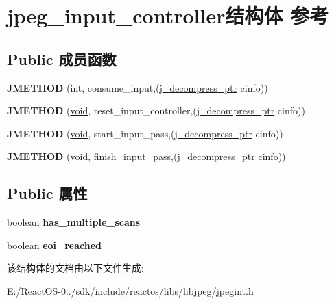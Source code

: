 \hypertarget{structjpeg__input__controller}{}\section{jpeg\+\_\+input\+\_\+controller结构体 参考}
\label{structjpeg__input__controller}
\subsection*{Public 成员函数}
\begin{DoxyCompactItemize}
\item 
\mbox{\label{structjpeg__input__controller_af742c796479db5dd8b3275307d76a103}} 
{\bfseries J\+M\+E\+T\+H\+OD} (int, consume\+\_\+input,(\hyperlink{structjpeg__decompress__struct}{j\+\_\+decompress\+\_\+ptr} cinfo))
\item 
\mbox{\label{structjpeg__input__controller_aa2720adb6f991abedb2e8c03804cac4f}} 
{\bfseries J\+M\+E\+T\+H\+OD} (\hyperlink{interfacevoid}{void}, reset\+\_\+input\+\_\+controller,(\hyperlink{structjpeg__decompress__struct}{j\+\_\+decompress\+\_\+ptr} cinfo))
\item 
\mbox{\label{structjpeg__input__controller_aef985c09924396a078c67592da47d679}} 
{\bfseries J\+M\+E\+T\+H\+OD} (\hyperlink{interfacevoid}{void}, start\+\_\+input\+\_\+pass,(\hyperlink{structjpeg__decompress__struct}{j\+\_\+decompress\+\_\+ptr} cinfo))
\item 
\mbox{\label{structjpeg__input__controller_a70620c8e0ea8fd2f7b0243cd9bf395e1}} 
{\bfseries J\+M\+E\+T\+H\+OD} (\hyperlink{interfacevoid}{void}, finish\+\_\+input\+\_\+pass,(\hyperlink{structjpeg__decompress__struct}{j\+\_\+decompress\+\_\+ptr} cinfo))
\end{DoxyCompactItemize}
\subsection*{Public 属性}
\begin{DoxyCompactItemize}
\item 
\mbox{\label{structjpeg__input__controller_a6f02f9c18464bfbf30b27f5a43c2665a}} 
boolean {\bfseries has\+\_\+multiple\+\_\+scans}
\item 
\mbox{\label{structjpeg__input__controller_a8e1c345f356d36f98c2ece4dc21549d7}} 
boolean {\bfseries eoi\+\_\+reached}
\end{DoxyCompactItemize}


该结构体的文档由以下文件生成\+:\begin{DoxyCompactItemize}
\item 
E\+:/\+React\+O\+S-\/0../sdk/include/reactos/libs/libjpeg/jpegint.\+h\end{DoxyCompactItemize}
